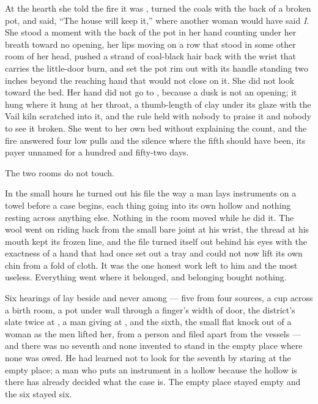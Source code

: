 At the hearth she told the fire it was , turned the coals with the back of a broken pot, and said, “The house will keep it,” where another woman would have said \emph{I}. She stood a moment with the back of the pot in her hand counting under her breath toward no opening, her lips moving on a row that stood in some other room of her head, pushed a strand of coal-black hair back with the wrist that carries the little-door burn, and set the pot rim out with its handle standing two inches beyond the reaching hand that would not close on it. She did not look toward the bed. Her hand did not go to , because a dusk is not an opening; it hung where it hung at her throat, a thumb-length of  clay under its glaze with the Vail kiln scratched into it, and the rule held with nobody to praise it and nobody to see it broken. She went to her own bed without explaining the count, and the fire answered four low pulls and the silence where the fifth should have been, its payer unnamed for a hundred and fifty-two days.

The two rooms do not touch.

\scenebreak

In the small hours he turned out his file the way a man lays instruments on a towel before a case begins, each thing going into its own hollow and nothing resting across anything else. Nothing in the room moved while he did it. The wool went on riding back from the small bare joint at his wrist, the thread at his mouth kept its frozen line, and the file turned itself out behind his eyes with the exactness of a hand that had once set out a tray and could not now lift its own chin from a fold of cloth. It was the one honest work left to him and the most useless. Everything went where it belonged, and belonging bought nothing.

Six hearings of  lay beside and never among --- five from four sources, a cup across a birth room, a pot under  wall through a finger's width of door, the district's slate twice at , a man giving at , and the sixth, the small flat knock out of a woman as the men lifted her, from a person and filed apart from the vessels --- and there was no seventh and none invented to stand in the empty place where none was owed. He had learned not to look for the seventh by staring at the empty place; a man who puts an instrument in a hollow because the hollow is there has already decided what the case is. The empty place stayed empty and the six stayed six.

